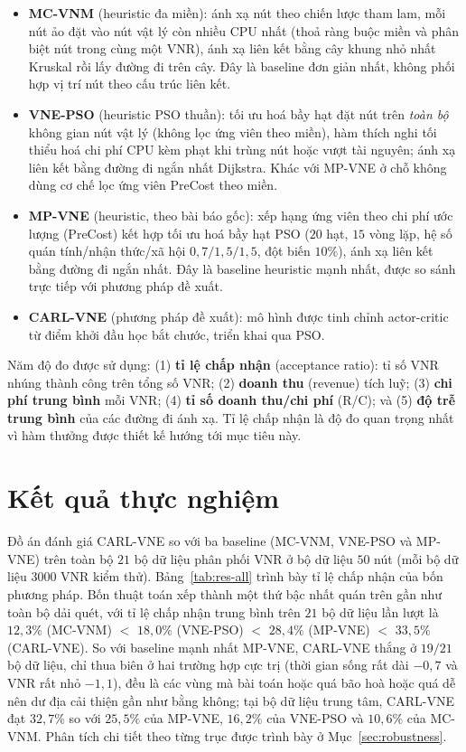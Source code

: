 \documentclass[../DoAn.tex]{subfiles}
\begin{document}
\begin{itemize}
\item \textbf{MC-VNM} (heuristic đa miền): ánh xạ nút theo chiến lược tham lam, mỗi nút ảo đặt vào nút vật lý còn nhiều CPU nhất (thoả ràng buộc miền và phân biệt nút trong cùng một VNR), ánh xạ liên kết bằng cây khung nhỏ nhất Kruskal rồi lấy đường đi trên cây. Đây là baseline đơn giản nhất, không phối hợp vị trí nút theo cấu trúc liên kết.
\item \textbf{VNE-PSO} (heuristic PSO thuần): tối ưu hoá bầy hạt đặt nút trên \textit{toàn bộ} không gian nút vật lý (không lọc ứng viên theo miền), hàm thích nghi tối thiểu hoá chi phí CPU kèm phạt khi trùng nút hoặc vượt tài nguyên; ánh xạ liên kết bằng đường đi ngắn nhất Dijkstra. Khác với MP-VNE ở chỗ không dùng cơ chế lọc ứng viên PreCost theo miền.
\item \textbf{MP-VNE} (heuristic, theo bài báo gốc): xếp hạng ứng viên theo chi phí ước lượng (PreCost) kết hợp tối ưu hoá bầy hạt PSO ($20$ hạt, $15$ vòng lặp, hệ số quán tính/nhận thức/xã hội $0{,}7/1{,}5/1{,}5$, đột biến $10\%$), ánh xạ liên kết bằng đường đi ngắn nhất. Đây là baseline heuristic mạnh nhất, được so sánh trực tiếp với phương pháp đề xuất.
\item \textbf{CARL-VNE} (phương pháp đề xuất): mô hình được tinh chỉnh actor-critic từ điểm khởi đầu học bắt chước, triển khai qua PSO.
\end{itemize}

Năm độ đo được sử dụng: (1) \textbf{tỉ lệ chấp nhận} (acceptance ratio): tỉ số VNR nhúng thành công trên tổng số VNR; (2) \textbf{doanh thu} (revenue) tích luỹ; (3) \textbf{chi phí trung bình} mỗi VNR; (4) \textbf{tỉ số doanh thu/chi phí} (R/C); và (5) \textbf{độ trễ trung bình} của các đường đi ánh xạ. Tỉ lệ chấp nhận là độ đo quan trọng nhất vì hàm thưởng được thiết kế hướng tới mục tiêu này.

\section{Kết quả thực nghiệm}
\label{sec:results-overall}

Đồ án đánh giá CARL-VNE so với ba baseline (MC-VNM, VNE-PSO và MP-VNE) trên toàn bộ $21$ bộ dữ liệu phân phối VNR ở bộ dữ liệu $50$ nút (mỗi bộ dữ liệu $3000$ VNR kiểm thử). Bảng~\ref{tab:res-all} trình bày tỉ lệ chấp nhận của bốn phương pháp. Bốn thuật toán xếp thành một thứ bậc nhất quán trên gần như toàn bộ dải quét, với tỉ lệ chấp nhận trung bình trên $21$ bộ dữ liệu lần lượt là $12{,}3\%$ (MC-VNM) $<$ $18{,}0\%$ (VNE-PSO) $<$ $28{,}4\%$ (MP-VNE) $<$ $33{,}5\%$ (CARL-VNE). So với baseline mạnh nhất MP-VNE, CARL-VNE thắng ở \textbf{$19/21$} bộ dữ liệu, chỉ thua biên ở hai trường hợp cực trị (thời gian sống rất dài $-0{,}7$ và VNR rất nhỏ $-1{,}1$), đều là các vùng mà bài toán hoặc quá bão hoà hoặc quá dễ nên dư địa cải thiện gần như bằng không; tại bộ dữ liệu trung tâm, CARL-VNE đạt $32{,}7\%$ so với $25{,}5\%$ của MP-VNE, $16{,}2\%$ của VNE-PSO và $10{,}6\%$ của MC-VNM. Phân tích chi tiết theo từng trục được trình bày ở Mục~\ref{sec:robustness}.
\end{document}
